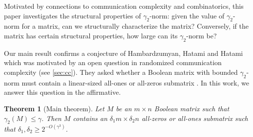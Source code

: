 \documentclass[11pt]{amsart}
\theoremstyle{plain}
\newtheorem{theorem}{Theorem}[section]
\newtheorem{mtheorem}[theorem]{Main Theorem}
\theoremstyle{definition}
\newcommand{\istvan}[1]{\textcolor{red}{it: #1}}
\newcommand{\lianna}[1]{\textcolor{blue}{lh: #1}}
\begin{document}
 
Motivated by connections to communication complexity and combinatorics, this paper investigates the structural properties of $\gamma_2$-norm: given the value of $\gamma_2$-norm for a matrix,  can we structurally characterize the matrix? Conversely, if the matrix has certain structural properties, how large can its $\gamma_2$-norm be? %

Our main result confirms a conjecture of Hambardzumyan, Hatami and Hatami \cite{HHH} which was motivated by an open question in randomized communication complexity (see \cref{sec:cc}). They asked whether a Boolean matrix with bounded $\gamma_2$-norm must contain a linear-sized all-ones or all-zeros submatrix \cite{HHH}. In this work, we answer this question in the affirmative.

\begin{theorem}[Main theorem]\label{thm:mono_rectangle}
    Let $M$ be an $m\times n$ Boolean matrix such that $\gamma_2(M)\leq \gamma$. Then $M$ contains an $\delta_1 m\times \delta_2 n$ all-zeros or all-ones submatrix such that $\delta_1,\delta_2\geq 2^{-O(\gamma^3)}$.
\end{theorem}
\end{document}
